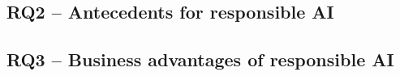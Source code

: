 \subsection{RQ2 -- Antecedents for responsible AI}

\subsection{RQ3 -- Business advantages of responsible AI}



